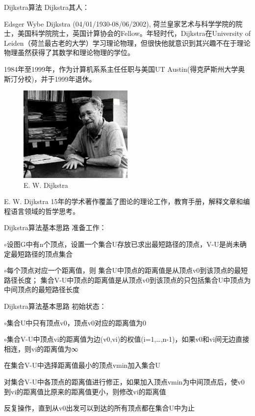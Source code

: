\documentclass[10pt]{beamer}
\begin{document}
\begin{frame}[allowframebreaks]{Dijkstra算法}
Dijkstra其人：

Edsger Wybe Dijkstra (04/01/1930-08/06/2002),  荷兰皇家艺术与科学学院的院士，美国科学院院士，英国计算协会的Fellow。年轻时代，Dijkstra在University of Leiden（荷兰最古老的大学）学习理论物理，但很快他就意识到其兴趣不在于理论物理虽然获得了其数学和理论物理的学位。

1984年至1999年，作为计算机系系主任任职与美国UT Austin(得克萨斯州大学奥斯汀分校)，并于1999年退休。 
\begin{figure}[htp]
  \centering
  \includegraphics[width = 0.5\textwidth]{73.png}
  \caption{E. W. Dijkstra}
\end{figure}


E. W. Dijkstra 15年的学术著作覆盖了图论的理论工作，教育手册，解释文章和编程语言领域的哲学思考。

\end{frame}
\begin{frame}[allowframebreaks]{Dijkstra算法基本思路}
准备工作：

$\circ$设图G中有n个顶点，设置一个集合U存放已求出最短路径的顶点，V-U是尚未确定最短路径的顶点集合

$\circ$每个顶点对应一个距离值，则
集合U中顶点的距离值是从顶点v0到该顶点的最短路径长度；
集合V-U中顶点的距离值是从顶点v0到该顶点的只包括集合U中顶点为中间顶点的最短路径长度
\end{frame}
\begin{frame}[allowframebreaks]{Dijkstra算法基本思路}
初始状态：

$\circ$集合U中只有顶点v0，顶点v0对应的距离值为0

$\circ$集合V-U中顶点vi的距离值为边(v0,vi)的权值(i=1,…,n-1)，如果v0和vi间无边直接相连，则vi的距离值为∞

在集合V-U中选择距离值最小的顶点vmin加入集合U

对集合V-U中各顶点的距离值进行修正，如果加入顶点vmin为中间顶点后，使v0到vi的距离值比原来的距离值更小，则修改vi的距离值

反复操作，直到从v0出发可以到达的所有顶点都在集合U中为止


\end{frame}
\end{document}
